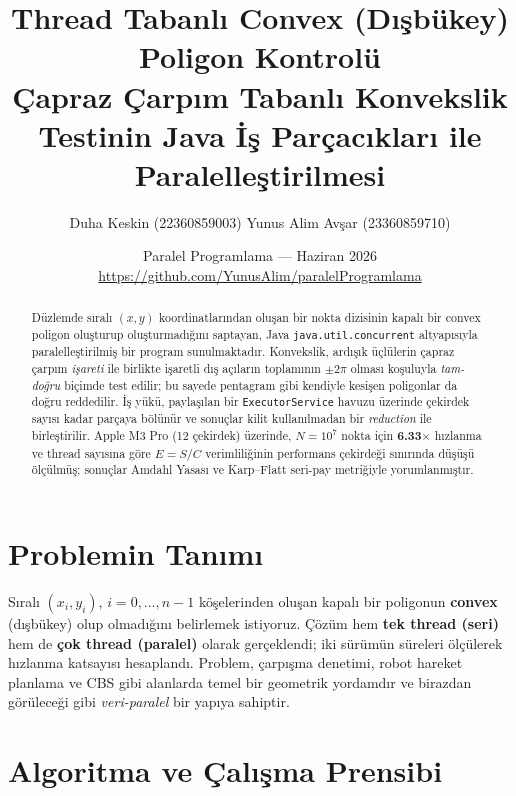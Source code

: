 \documentclass[11pt,a4paper]{article}
\title{\vspace{-1.2cm}\textbf{\color{navy} Thread Tabanlı Convex (Dışbükey) Poligon Kontrolü}\\[2pt]
\large Çapraz Çarpım Tabanlı Konvekslik Testinin Java İş Parçacıkları ile Paralelleştirilmesi}
\author{Duha Keskin (22360859003) \quad Yunus Alim Avşar (23360859710)}
\date{Paralel Programlama --- Haziran 2026\\[3pt]
{\small\url{https://github.com/YunusAlim/paralelProgramlama}}}
\newcommand{\code}[1]{\texttt{\small #1}}
\begin{document}
\maketitle
\vspace{-0.6cm}

\begin{abstract}\noindent\small
Düzlemde sıralı $(x,y)$ koordinatlarından oluşan bir nokta dizisinin kapalı bir convex
poligon oluşturup oluşturmadığını saptayan, Java \code{java.util.concurrent} altyapısıyla
paralelleştirilmiş bir program sunulmaktadır. Konvekslik, ardışık üçlülerin çapraz çarpım
\emph{işareti} ile birlikte işaretli dış açıların toplamının $\pm2\pi$ olması koşuluyla
\emph{tam-doğru} biçimde test edilir; bu sayede pentagram gibi kendiyle kesişen poligonlar da
doğru reddedilir. İş yükü, paylaşılan bir \code{ExecutorService} havuzu üzerinde çekirdek
sayısı kadar parçaya bölünür ve sonuçlar kilit kullanılmadan bir \emph{reduction} ile
birleştirilir. Apple M3 Pro (12 çekirdek) üzerinde, $N=10^{7}$ nokta için \textbf{6.33$\times$}
hızlanma ve thread sayısına göre $E=S/C$ verimliliğinin performans çekirdeği sınırında düşüşü
ölçülmüş; sonuçlar Amdahl Yasası ve Karp--Flatt seri-pay metriğiyle yorumlanmıştır.
\end{abstract}

\section{Problemin Tanımı}
Sıralı $(x_i,y_i)$, $i=0,\dots,n-1$ köşelerinden oluşan kapalı bir poligonun
\textbf{convex} (dışbükey) olup olmadığını belirlemek istiyoruz. Çözüm hem \textbf{tek thread
(seri)} hem de \textbf{çok thread (paralel)} olarak gerçeklendi; iki sürümün süreleri ölçülerek
hızlanma katsayısı hesaplandı. Problem, çarpışma denetimi, robot hareket planlama ve CBS gibi
alanlarda temel bir geometrik yordamdır ve birazdan görüleceği gibi \emph{veri-paralel} bir
yapıya sahiptir.

\section{Algoritma ve Çalışma Prensibi}
\end{document}
